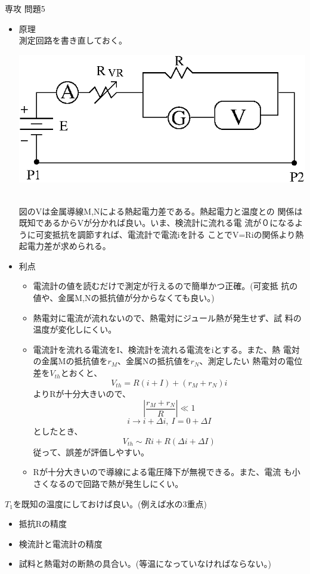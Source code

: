 \documentclass[fleqn]{jbook}
\begin{document}
\begin{answer}{専攻 問題5}{}
\begin{subanswers}
\begin{subsubanswers}
\begin{itemize}
\item 原理\\
      測定回路を書き直しておく。\\
\begin{center}
\leavevmode
%
 \includegraphics[clip]{1998phy5-1.eps}
\end{center}
\ \\
      図のVは金属導線M,Nによる熱起電力差である。熱起電力と温度との
      関係は既知であるからVが分かれば良い。いま、検流計に流れる電
      流が０になるように可変抵抗を調節すれば、電流計で電流iを計る
      ことでV=Riの関係より熱起電力差が求められる。
\item 利点\\
\begin{itemize}
\item 電流計の値を読むだけで測定が行えるので簡単かつ正確。(可変抵
      抗の値や、金属M,Nの抵抗値が分からなくても良い。)
\item 熱電対に電流が流れないので、熱電対にジュール熱が発生せず、試
      料の温度が変化しにくい。
\item 電流計を流れる電流をI、検流計を流れる電流をiとする。また、熱
      電対の金属Mの抵抗値を$r_M$、金属Nの抵抗値を$r_N$、測定したい
      熱電対の電位差を$V_{th}$とおくと、
\[
 V_{th}=R(i+I)+(r_M+r_N)i
\]
よりRが十分大きいので、
\[
 \left|\frac{r_M+r_N}{R}\right|\ll 1
\]
\[
 i\rightarrow i+\Delta i,\ I=0+\Delta I
\]
としたとき、
\[
 V_{th}\sim Ri+R(\Delta i+\Delta I)
\]
従って、誤差が評価しやすい。
\item Rが十分大きいので導線による電圧降下が無視できる。また、電流
      も小さくなるので回路で熱が発生しにくい。
\end{itemize}
\end{itemize}
\SubSubAnswer
 $T_1$を既知の温度にしておけば良い。(例えば水の3重点)

\SubSubAnswer
\begin{itemize}
\item 抵抗Rの精度
\item 検流計と電流計の精度
\item 試料と熱電対の断熱の具合い。(等温になっていなければならない。)
\end{itemize}

\end{subsubanswers}



\end{subanswers}
\end{answer}
\end{document}
